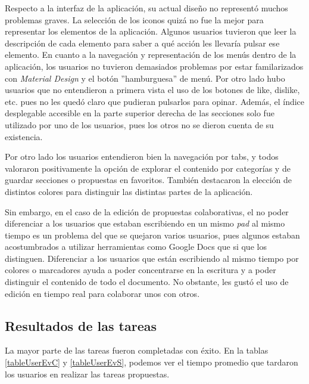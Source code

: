 Respecto a la interfaz de la aplicación, su actual diseño no representó muchos problemas graves. La selección de los iconos quizá no fue la mejor para representar los elementos de la aplicación. Algunos usuarios tuvieron que leer la descripción de cada elemento para saber a qué acción les llevaría pulsar ese elemento. En cuanto a la navegación y representación de los menús dentro de la aplicación, los usuarios no tuvieron demasiados problemas por estar familarizados con \textit{Material Design} y el botón ''hamburguesa'' de menú. Por otro lado hubo usuarios que no entendieron a primera vista el uso de los botones de like, dislike, etc. pues no les quedó claro que pudieran pulsarlos para opinar. Además, el índice desplegable accesible en la parte superior derecha de las secciones solo fue utilizado por uno de los usuarios, pues los otros no se dieron cuenta de su existencia. 

Por otro lado los usuarios entendieron bien la navegación por tabs, y todos valoraron positivamente la opción de explorar el contenido por categorías y de guardar secciones o propuestas en favoritos. También destacaron la elección de distintos colores para distinguir las distintas partes de la aplicación.

Sin embargo, en el caso de la edición de propuestas colaborativas, el no poder diferenciar a los usuarios que estaban escribiendo en un mismo \textit{pad} al mismo tiempo es un problema del que se quejaron varios usuarios, pues algunos estaban acostumbrados a utilizar herramientas como Google Docs que si que los distinguen. Diferenciar a los usuarios que están escribiendo al mismo tiempo por colores o marcadores  ayuda a poder concentrarse en la escritura y a poder distinguir el contenido de todo el documento. No obstante, les gustó el uso de edición en tiempo real para colaborar unos con otros.

\subsection{Resultados de las tareas}

La mayor parte de las tareas fueron completadas con éxito. En la tablas \ref{tableUserEvC} y \ref{tableUserEvS}, podemos ver el tiempo promedio que tardaron los usuarios en realizar las tareas propuestas.

